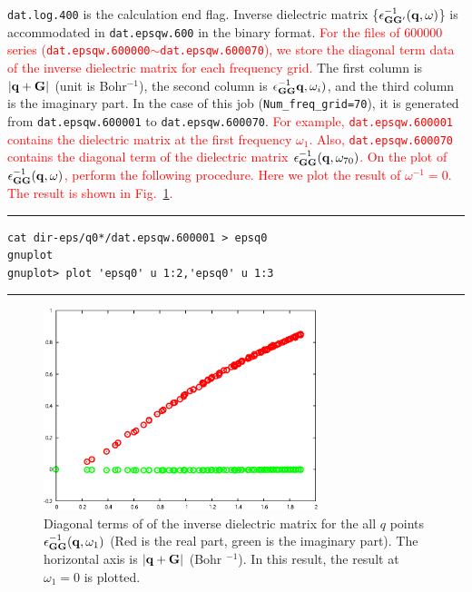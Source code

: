 \documentclass{article}
\newcommand{\tr}[1]{\textcolor{red}{#1}}
\begin{document}
\verb+dat.log.400+ is the calculation end flag. Inverse dielectric matrix \{$\epsilon_{{\bf GG'}}^{-1}({\bf q},\omega)$\} is accommodated in \verb+dat.epsqw.600+ in the binary format. \tr{For the files of 600000 series ({\tt dat.epsqw.600000}$\sim${\tt dat.epsqw.600070}), we store the diagonal term data of the inverse dielectric matrix for each frequency grid.} The first column is $|{\bf q+G}|$ (unit is Bohr$^{- 1}$), the second column is $\epsilon_{{\bf GG}}^{-1}{\bf q}, \omega_i)$, and the third column is the imaginary part. In the case of this job (\verb+Num_freq_grid=70+), it is generated from \verb+dat.epsqw.600001+ to \verb+dat.epsqw.600070+. \tr{For example, {\tt dat.epsqw.600001}  contains the dielectric matrix at the first frequency $\omega_1$. Also, {\tt dat.epsqw.600070} contains the diagonal term of the dielectric matrix $\epsilon_{{\bf GG}}^{-1}({\bf q}, \omega_{70})$. On the plot of $\epsilon_{{\bf GG}}^{-1}({\bf q},\omega)$, perform the following procedure. Here we plot the result of $\omega^{-1}=0$. The result is shown in Fig.~\ref{epsqw}.}  
\vspace{3mm}\hrule
\begin{verbatim}
cat dir-eps/q0*/dat.epsqw.600001 > epsq0
gnuplot
gnuplot> plot 'epsq0' u 1:2,'epsq0' u 1:3  
\end{verbatim}
\hrule\vspace{3mm}
\begin{figure}[H] 
\centering
\includegraphics[width=8cm]{epsq0-Al.eps}
\caption{Diagonal terms of of the inverse dielectric matrix for the all $q$ points $\epsilon_{{\bf GG}}^{-1}({\bf q}, \omega_1)$ (Red is the real part, green is the imaginary part). The horizontal axis is $|{\bf q+G}|$ (Bohr $^{-1}$). In this result, the result at $\omega_1=0$ is plotted.}
\label{epsqw}
\end{figure}
\end{document}

